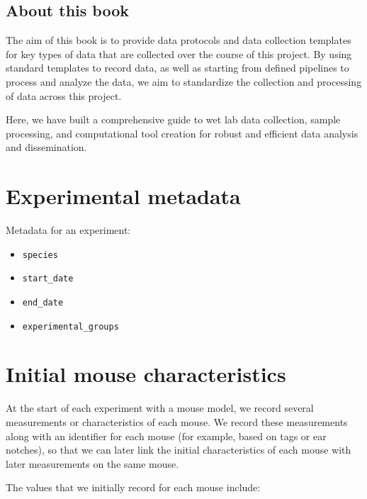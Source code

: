 \documentclass[
]{book}
\providecommand{\tightlist}{%
  \setlength{\itemsep}{0pt}\setlength{\parskip}{0pt}}
\begin{document}
\hypertarget{about-this-book}{%
\section{About this book}\label{about-this-book}}

The aim of this book is to provide data protocols and data collection templates
for key types of data that are collected over the course of this project. By using
standard templates to record data, as well as starting from defined pipelines to
process and analyze the data, we aim to standardize the collection and processing
of data across this project.

Here, we have built a comprehensive guide to wet lab data collection, sample processing, and computational tool creation for robust and efficient data analysis and dissemination.

\hypertarget{experimental-metadata}{%
\chapter{Experimental metadata}\label{experimental-metadata}}

Metadata for an experiment:

\begin{itemize}
\tightlist
\item
  \texttt{species}
\item
  \texttt{start\_date}
\item
  \texttt{end\_date}
\item
  \texttt{experimental\_groups}
\end{itemize}

\hypertarget{initial-mouse-characteristics}{%
\chapter{Initial mouse characteristics}\label{initial-mouse-characteristics}}

At the start of each experiment with a mouse model, we record several measurements
or characteristics of each mouse. We record these measurements along with an identifier
for each mouse (for example, based on tags or ear notches), so that we can later
link the initial characteristics of each mouse with later measurements on the same
mouse.

The values that we initially record for each mouse include:
\end{document}

